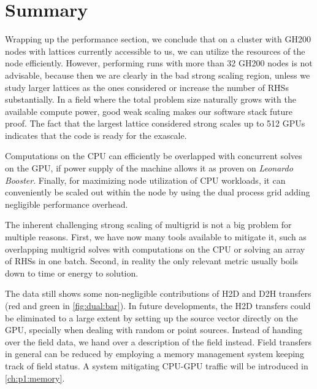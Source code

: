\section{Summary}
\label{sec:perf:summary}

Wrapping up the performance section, we conclude that on a cluster with GH200 nodes with lattices currently accessible to us, we can utilize the resources of the node efficiently.
However, performing runs with more than \num{32} GH200 nodes is not advisable, because then we are clearly in the bad strong scaling region, unless we study larger lattices as the ones considered or increase the number of RHSs substantially.
In a field where the total problem size naturally grows with the available compute power, good weak scaling makes our software stack future proof.
The fact that the largest lattice considered strong scales up to \num{512} GPUs indicates that the code is ready for the exascale.


Computations on the CPU can efficiently be overlapped with concurrent solves on the GPU, if power supply of the machine allows it as proven on \emph{Leonardo Booster}.
Finally, for maximizing node utilization of CPU workloads, it can conveniently be scaled out within the node by using the dual process grid adding negligible performance overhead.

The inherent challenging strong scaling of multigrid is not a big problem for multiple reasons.
First, we have now many tools available to mitigate it, such as overlapping multigrid solves with computations on the CPU or solving an array of RHSs in one batch.
Second, in reality the only relevant metric usually boils down to time or energy to solution.

The data still shows some non-negligible contributions of H2D and D2H transfers (red and green in \cref{fig:dual:bar}).
In future developments, the H2D transfers could be eliminated to a large extent by setting up the source vector directly on the GPU, specially when dealing with random or point sources.
Instead of handing over the field data, we hand over a description of the field instead.
Field transfers in general can be reduced by employing a memory management system keeping track of field status.
A system mitigating CPU-GPU traffic will be introduced in \cref{ch:p1:memory}.


